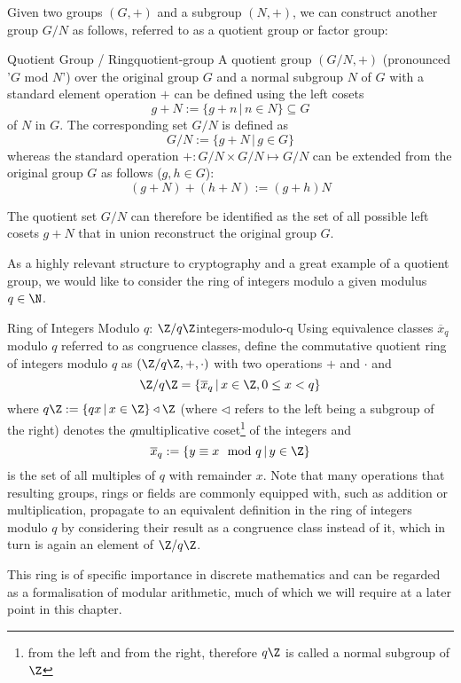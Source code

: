 Given two groups $(G, +)$ and a subgroup $(N, +)$, we can construct another group $G / N$ as follows, referred to as a quotient group or factor group:

\begin{definition}{Quotient Group / Ring}{quotient-group}
  A quotient group $(G / N, +)$ (pronounced '$G$ mod $N$') over the original group $G$ and a normal subgroup $N$ of $G$
  with a standard element operation $+$ can be defined using the left cosets
  $$g+N := \{g+n \,|\, n \in N\} \subseteq G$$ of $N$ in $G$.
  The corresponding set $G / N$ is defined as
  $$G / N := \{g + N \,|\, g \in G\}$$
  whereas the standard operation $+: G/N \times G/N \mapsto G/N$
  can be extended from the original group $G$ as follows ($g, h \in G$):
  $$(g+N) + (h+N) := (g+h)N$$
\end{definition}

The quotient set $G / N$ can therefore be identified as the set of all possible left cosets $g + N$ that in union reconstruct the original group $G$.

As a highly relevant structure to cryptography and a great example of a quotient group, we would like to consider the ring of integers modulo a given modulus $q \in \N$.

\begin{lemma}{Ring of Integers Modulo $q$: $\Z / q \Z$}{integers-modulo-q}
  Using equivalence classes $\overline{x}_q$ modulo $q$ referred to as congruence classes,
  define the commutative quotient ring of integers modulo $q$ as $(\Z / q \Z, +, \cdot)$ with
  two operations $+$ and $\cdot$ and
  $$\Z / q \Z = \{\overline{x}_q \,|\, x \in \Z, 0 \leq x < q\}$$
  where $q \Z := \{q x \,|\, x \in \Z\} \triangleleft \Z$ (where $\triangleleft$ refers to the left being a subgroup of the right) denotes the $q$\th multiplicative coset\footnote{
    from the left and from the right, therefore $q \Z$ is called a normal subgroup of $\Z$
  } of the integers and
  $$\overline{x}_q := \{y \equiv x \mod q \,|\, y \in \Z\}$$
  is the set of all multiples of $q$ with remainder $x$.
  Note that many operations that resulting groups, rings or fields are commonly equipped with, such as addition or multiplication, propagate to an equivalent definition in the ring of integers modulo $q$ by considering their result as a congruence class instead of it, which in turn is again an element of $\Z / q \Z$.
\end{lemma}

This ring is of specific importance in discrete mathematics and can be regarded as a formalisation of modular arithmetic, much of which we will require at a later point in this chapter.

